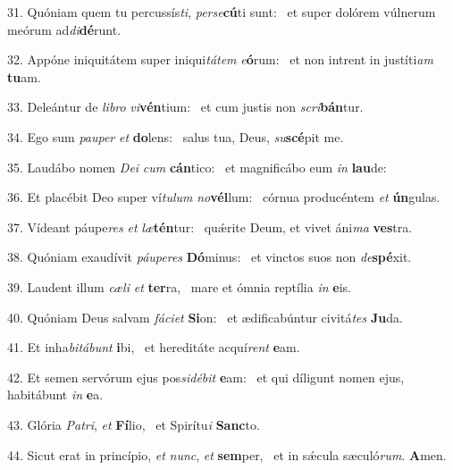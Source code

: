 31. Quóniam quem tu percussís\textit{ti}, \textit{per}\textit{se}\textbf{cú}ti sunt: \ast\  et super dolórem vúlnerum meórum ad\textit{di}\textbf{dé}runt.\

32. Appóne iniquitátem super iniqui\textit{tá}\textit{tem} \textit{e}\textbf{ó}rum: \ast\  et non intrent in justíti\textit{am} \textbf{tu}am.\

33. Deleántur de \textit{li}\textit{bro} \textit{vi}\textbf{vén}tium: \ast\  et cum justis non \textit{scri}\textbf{bán}tur.\

34. Ego sum \textit{pau}\textit{per} \textit{et} \textbf{do}lens: \ast\  salus tua, Deus, \textit{su}\textbf{scé}pit me.\

35. Laudábo nomen \textit{De}\textit{i} \textit{cum} \textbf{cán}tico: \ast\  et magnificábo eum \textit{in} \textbf{lau}de:\

36. Et placébit Deo super ví\textit{tu}\textit{lum} \textit{no}\textbf{vél}lum: \ast\  córnua producéntem \textit{et} \textbf{ún}gulas.\

37. Vídeant páupe\textit{res} \textit{et} \textit{læ}\textbf{tén}tur: \ast\  quǽrite Deum, et vivet áni\textit{ma} \textbf{ves}tra.\

38. Quóniam exaudívit \textit{páu}\textit{pe}\textit{res} \textbf{Dó}minus: \ast\  et vinctos suos non \textit{de}\textbf{spé}xit.\

39. Laudent illum \textit{cæ}\textit{li} \textit{et} \textbf{ter}ra, \ast\  mare et ómnia reptília \textit{in} \textbf{e}is.\

40. Quóniam Deus salvam \textit{fá}\textit{ci}\textit{et} \textbf{Si}on: \ast\  et ædificabúntur civitá\textit{tes} \textbf{Ju}da.\

41. Et inha\textit{bi}\textit{tá}\textit{bunt} \textbf{i}bi, \ast\  et hereditáte acquí\textit{rent} \textbf{e}am.\

42. Et semen servórum ejus pos\textit{si}\textit{dé}\textit{bit} \textbf{e}am: \ast\  et qui díligunt nomen ejus, habitábunt \textit{in} \textbf{e}a.\

43. Glória \textit{Pa}\textit{tri}, \textit{et} \textbf{Fí}lio, \ast\  et Spirítu\textit{i} \textbf{Sanc}to.\

44. Sicut erat in princípio, \textit{et} \textit{nunc}, \textit{et} \textbf{sem}per, \ast\  et in sǽcula sæculó\textit{rum}. \textbf{A}men.\

